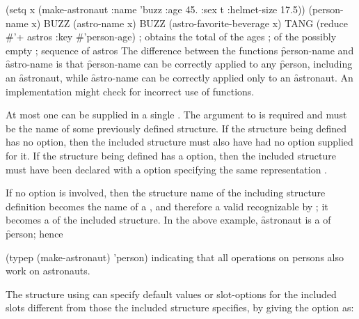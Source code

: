 \code
 (setq x (make-astronaut :name 'buzz
                         :age 45.
                         :sex t
                         :helmet-size 17.5))
 (person-name x) \EV BUZZ
 (astro-name x) \EV BUZZ
 (astro-favorite-beverage x) \EV TANG
\endcode
{}
\code
 (reduce #'+ astros :key #'person-age) ; obtains the total of the ages 
                                       ; of the possibly empty
                                       ; sequence of astros
\endcode
{}
The difference between the  functions \f{person-name} and \f{astro-name}
is that \f{person-name} can be correctly applied to any \f{person},
including an \f{astronaut}, while \f{astro-name} can be correctly
applied only to an \f{astronaut}.  An implementation might 
check for incorrect use of  functions.

At most one  can be supplied in a single .
The argument to  is required and must be the
name of some previously defined structure.  If the structure being
defined has no  option, then the included structure must
also have had no  option supplied for it.
If the structure being defined has a  option,
then the included structure must have been declared with a 
option specifying the same representation .

If no  option is involved, then
the structure name of the including structure definition
becomes the name of a , and therefore
a valid  recognizable by ; it becomes
a  of the included structure.  
In the above example,
\f{astronaut} is a  of \f{person}; hence

\code
 (typep (make-astronaut) 'person) \EV {}
\endcode
indicating that all operations on persons also
work on astronauts.

The structure using  can specify default values or
slot-options for the included slots different from those the included
structure specifies, by giving the  option as:

